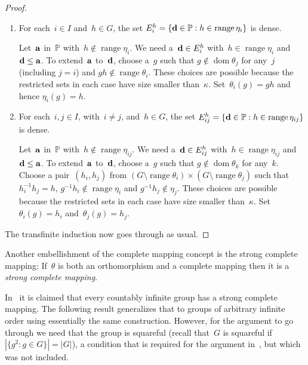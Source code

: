 \documentclass[12pt,a4paper]{article}
\DeclareMathOperator{\dom}{dom}
\DeclareMathOperator{\ran}{range}
\renewcommand{\P}{\mathbb{P}}
\begin{document}
\begin{proof}
\begin{enumerate}
\item For each~$i \in I$ and~$h \in G$, the set $E_i^h = \{ {\bf d} \in \P : h \in \ran \eta_i \}$ is dense.

Let~${\bf a}$ in~$\P$ with~$h \not\in \ran \eta_i$.  We need a~${\bf d} \in E_i^h$ with~$h \in \ran \eta_i$ and ${\bf d} \leq {\bf a}$.  To extend~${\bf a}$ to~${\bf d}$, choose a~$g$ such that $g \not\in \dom \theta_j$ for any~$j$ (including $j=i$) and $gh \not\in \ran \theta_i$.  These choices are possible because the restricted sets in each case have size smaller than~$\kappa$.  Set~$\theta_i(g) = gh$  and hence $\eta_i(g) = h$.   


\item For each~$i,j \in I$, with~$i \neq j$, and~$h \in G$, the set $E_{ij}^h = \{ {\bf d} \in \P : h \in \ran \eta_{ij} \}$ is dense.

Let~${\bf a}$ in~$\P$ with~$h \not\in \ran \eta_{ij}$.  We need a~${\bf d} \in E_{ij}^h$ with~$h \in \ran \eta_{ij}$ and ${\bf d} \leq {\bf a}$.  To extend~${\bf a}$ to~${\bf d}$, choose a~$g$ such that $g \not\in \dom \theta_k$ for any~$k$.   Choose a pair~$(h_i,h_j)$ from $(G \setminus \ran \theta_i) \times (G \setminus \ran \theta_j)$ such that~$h_i^{-1}h_j = h$, $g^{-1}h_i \not\in \ran \eta_i$ and $g^{-1}h_j \not\in \eta_j$. These choices are possible because the restricted sets in each case have size smaller than~$\kappa$.
 Set~$\theta_i(g) = h_i$ and~$\theta_j(g) = h_j$.


\end{enumerate}

The transfinite induction now goes through as usual.
\end{proof}






Another embellishment of the complete mapping concept is the strong complete mapping:
If~$\theta$ is both an orthomorphism and a complete mapping then it is a {\em strong complete mapping}.   

In~\cite{Evans12} it is claimed that every countably infinite group has a strong complete mapping.  The following result generalizes that to groups of arbitrary infinite order using essentially the same construction.  However, for the argument to go through we need that the group is squareful (recall that~$G$ is squareful if $|\{g^2 : g \in G \}| = |G|$), a condition that is required for the argument in~\cite{Evans12}, but which was not included.

\end{document}
